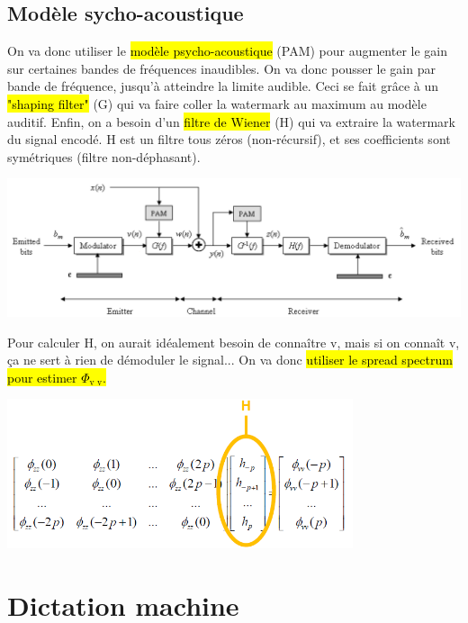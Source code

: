 \documentclass[letterpaper, 12pt]{article}
\newcommand{\alinea}{
\hspace*{0.5cm}}
\begin{document}
		\subsection{Modèle sycho-acoustique}
			\alinea On va donc utiliser le \hl{modèle psycho-acoustique} (PAM) pour augmenter le gain sur certaines bandes de fréquences
				inaudibles. On va donc pousser le gain par bande de fréquence, jusqu'à atteindre la limite audible. Ceci se fait grâce 
				à un \hl{"shaping filter"} (G) qui va faire coller la watermark au maximum au modèle auditif. Enfin, on a besoin
				d'un \hl{filtre de Wiener} (H) qui va extraire la watermark du signal encodé. H est un filtre tous zéros (non-récursif),
				et ses coefficients sont symétriques (filtre non-déphasant). 
			\begin{center}
				\includegraphics[width=6in]{Images/watermark-final}
			\end{center}
			\alinea Pour calculer H, on aurait idéalement besoin de connaître v, mais si on connaît v, ça ne sert à rien de démoduler le
				signal... On va donc \hl{utiliser le spread spectrum pour estimer $\Phi_{\text{v v}}$.}
			\begin{center}
				\includegraphics[width=4in]{Images/watermark-h}
			\end{center}
	\pagebreak
	\section{Dictation machine}
\end{document}
